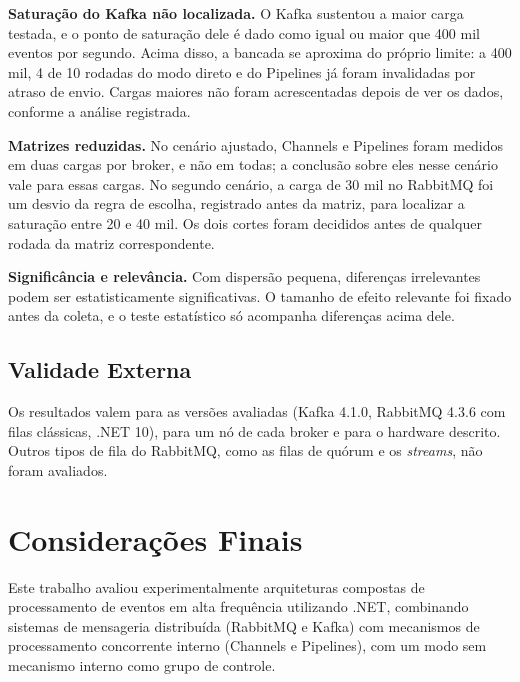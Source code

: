 \documentclass[12pt]{article}
\begin{document}
\textbf{Saturação do Kafka não localizada.} O Kafka sustentou a maior carga
testada, e o ponto de saturação dele é dado como igual ou maior que 400 mil
eventos por segundo. Acima disso, a bancada se aproxima do próprio limite: a
400 mil, 4 de 10 rodadas do modo direto e do Pipelines já foram invalidadas por
atraso de envio. Cargas maiores não foram acrescentadas depois de ver os dados,
conforme a análise registrada.

\textbf{Matrizes reduzidas.} No cenário ajustado, Channels e Pipelines foram medidos em
duas cargas por broker, e não em todas; a conclusão sobre eles nesse cenário vale para
essas cargas. No segundo cenário, a carga de 30 mil no RabbitMQ foi um desvio da regra
de escolha, registrado antes da matriz, para localizar a saturação entre 20 e 40 mil.
Os dois cortes foram decididos antes de qualquer rodada da matriz correspondente.

\textbf{Significância e relevância.} Com dispersão pequena, diferenças irrelevantes
podem ser estatisticamente significativas. O tamanho de efeito relevante foi fixado
antes da coleta, e o teste estatístico só acompanha diferenças acima dele.

\subsection{Validade Externa}

Os resultados valem para as versões avaliadas (Kafka 4.1.0, RabbitMQ 4.3.6 com filas
clássicas, .NET 10), para um nó de cada broker e para o hardware descrito. Outros tipos de
fila do RabbitMQ, como as filas de quórum e os \textit{streams}, não foram avaliados.


\section{Considerações Finais}
\label{sec:conclusao}

Este trabalho avaliou experimentalmente arquiteturas compostas de processamento de eventos
em alta frequência utilizando .NET, combinando sistemas de mensageria distribuída
(RabbitMQ e Kafka) com mecanismos de processamento concorrente interno (Channels e
Pipelines), com um modo sem mecanismo interno como grupo de controle.
\end{document}
